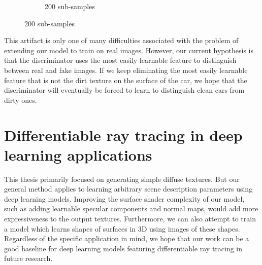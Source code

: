 \begin{figure}
\begin{subfigure}[t]{0.32\linewidth}
        \caption{200 sub-samples}
    \end{subfigure}
\end{figure}

This artifact is only one of many difficulties associated with the problem of extending our
model to train on real images. However, our current hypothesis is that the discriminator uses
the most easily learnable feature to distinguish between real and fake images. If we keep
eliminating the most easily learnable feature that is not the dirt texture on the surface of the
car, we hope that the discriminator will eventually be forced to learn to distinguish clean
cars from dirty ones.

\section{Differentiable ray tracing in deep learning applications}

This thesis primarily focused on generating simple diffuse textures. But our general method
applies to learning arbitrary scene description parameters using deep learning models.
Improving the surface shader complexity of our model, such as adding learnable specular
components and normal maps, would add more expressiveness to the output textures. Furthermore,
we can also attempt to train a model which learns shapes of surfaces in 3D using images of
these shapes. Regardless of the specific application in mind, we hope that our work can be a
good baseline for deep learning models featuring differentiable ray tracing in future research.
